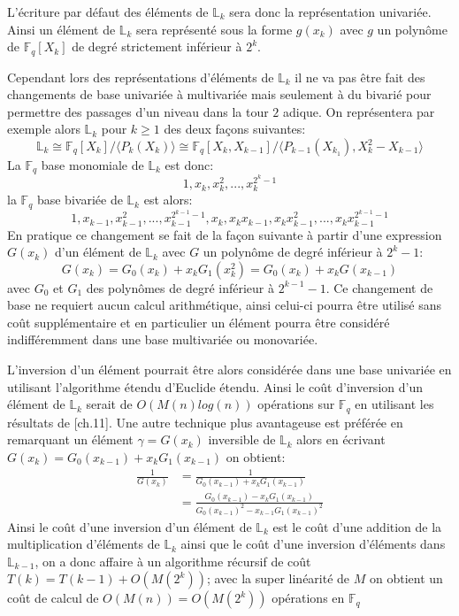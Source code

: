 \documentclass[10pt,a4paper]{book}
\theoremstyle{plain}
\theoremstyle{definition}
\theoremstyle{definition}
\theoremstyle{definition}
\theoremstyle{definition}
\theoremstyle{remark}
\theoremstyle{remark}
\begin{document}
L'écriture par défaut des éléments de $\mathbb{L}_k$ sera donc la représentation univariée. Ainsi un élément de $\mathbb{L}_k$ sera représenté sous la forme $g(x_k)$ avec $g$ un polynôme de $\mathbb{F}_q[X_k]$ de degré strictement inférieur à $2^k$. 

Cependant lors des représentations d'éléments de $\mathbb{L}_k$ il ne va pas être fait des changements de base univariée à multivariée mais seulement à du bivarié pour permettre des passages d'un niveau dans la tour $2$ adique. On représentera par exemple alors $\mathbb{L}_k$ pour $k\geqslant1$ des deux façons suivantes:
\begin{equation*}
\mathbb{L}_k \cong \mathbb{F}_q[X_k]/\langle P_k(X_k) \rangle \cong \mathbb{F}_q[X_k,X_{k-1}]/\langle P_{k-1}(X_{k_1}), X_k^2-X_{k-1}  \rangle
\end{equation*}  
La $\mathbb{F}_q$ base monomiale de $\mathbb{L}_k$ est donc:
\begin{equation*}
1,x_k,x_k^2,...,x_k^{2^k-1}
\end{equation*}
la $\mathbb{F}_q$ base bivariée de $\mathbb{L}_k$ est alors:
\begin{equation*}
1,x_{k-1},x_{k-1}^2,...,x_{k-1}^{2^{k-1}-1},x_k,x_kx_{k-1},x_kx_{k-1}^2,...,x_kx_{k-1}^{2^{k-1}-1}
\end{equation*}
En pratique ce changement se fait de la façon suivante à partir d'une expression $G(x_k)$ d'un élément de $\mathbb{L}_k$ avec $G$ un polynôme de degré inférieur à $2^k-1$:
\begin{equation*}
G(x_k)=G_0(x_k)+x_kG_1(x_k^2)=G_0(x_k)+x_kG(x_{k-1})
\end{equation*}
avec $G_0$ et $G_1$ des polynômes de degré inférieur à $2^{k-1}-1$. Ce changement de base ne requiert aucun calcul arithmétique, ainsi celui-ci pourra être utilisé sans coût supplémentaire et en particulier un élément pourra être considéré indifféremment dans une base multivariée ou monovariée.%

L'inversion d'un élément pourrait être alors considérée dans une base univariée en utilisant l'algorithme étendu d'Euclide étendu. Ainsi le coût d'inversion d'un élément de $\mathbb{L}_k$ serait de $O(M(n)log(n))$ opérations sur $\mathbb{F}_q$ en utilisant les résultats de \cite{vzGJG03}[ch.11]. Une autre technique plus avantageuse est préférée en remarquant un élément $\gamma=G(x_k)$ inversible de $\mathbb{L}_k$ alors en écrivant $G(x_k)=G_0(x_{k-1})+x_kG_1(x_{k-1})$ on obtient:
\begin{align*}
\frac{1}{G(x_k)} &=\frac{1}{G_0(x_{k-1})+x_kG_1(x_{k-1})} \\
 				&= \frac{G_0(x_{k-1})-x_kG_1(x_{k-1})}{G_0(x_{k-1})^2-x_{k-1}G_1(x_{k-1})^2}
\end{align*}
Ainsi le coût d'une inversion d'un élément de $\mathbb{L}_k$ est le coût d'une addition de la multiplication d'éléments de $\mathbb{L}_k$ ainsi que le coût d'une inversion d'éléments dans $\mathbb{L}_{k-1}$, on a donc affaire à un algorithme récursif de coût  $T(k)=T(k-1)+O(M(2^k))$; avec la super linéarité de $M$ on obtient un coût de calcul de $O(M(n))=O(M(2^k))$ opérations en $\mathbb{F}_q$
\end{document}
